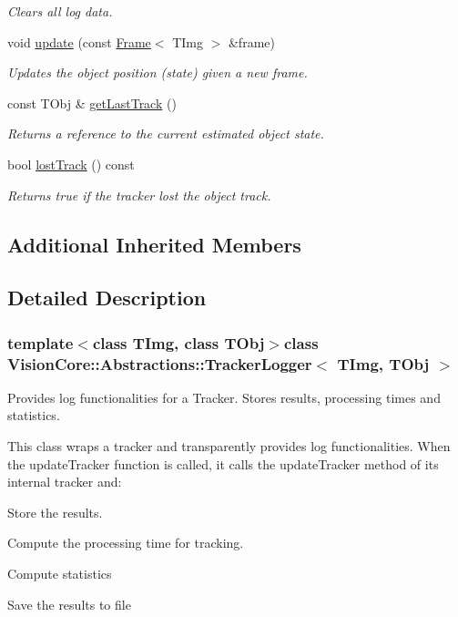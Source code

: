 \begin{DoxyCompactItemize}
\begin{DoxyCompactList}\small\item\em Clears all log data. \end{DoxyCompactList}\item 
void \hyperlink{class_vision_core_1_1_abstractions_1_1_tracker_logger_af1a54610c9af7fb54d00e4be2e75609e}{update} (const \hyperlink{struct_vision_core_1_1_data_structures_1_1_frame}{Frame}$<$ T\+Img $>$ \&frame)
\begin{DoxyCompactList}\small\item\em Updates the object position (state) given a new frame. \end{DoxyCompactList}\item 
const T\+Obj \& \hyperlink{class_vision_core_1_1_abstractions_1_1_tracker_logger_a60f002795ee2555f25dc4f7a9a0845ce}{get\+Last\+Track} ()
\begin{DoxyCompactList}\small\item\em Returns a reference to the current estimated object state. \end{DoxyCompactList}\item 
bool \hyperlink{class_vision_core_1_1_abstractions_1_1_tracker_logger_ac7e0977fa702f98038bbe303df458a6c}{lost\+Track} () const 
\begin{DoxyCompactList}\small\item\em Returns true if the tracker lost the object track. \end{DoxyCompactList}\end{DoxyCompactItemize}
\subsection*{Additional Inherited Members}


\subsection{Detailed Description}
\subsubsection*{template$<$class T\+Img, class T\+Obj$>$class Vision\+Core\+::\+Abstractions\+::\+Tracker\+Logger$<$ T\+Img, T\+Obj $>$}

Provides log functionalities for a Tracker. Stores results, processing times and statistics. 

This class wraps a tracker and transparently provides log functionalities. When the update\+Tracker function is called, it calls the update\+Tracker method of its internal tracker and\+:
\begin{DoxyItemize}
\item Store the results.
\item Compute the processing time for tracking.
\item Compute statistics
\item Save the results to file 
\end{DoxyItemize}

